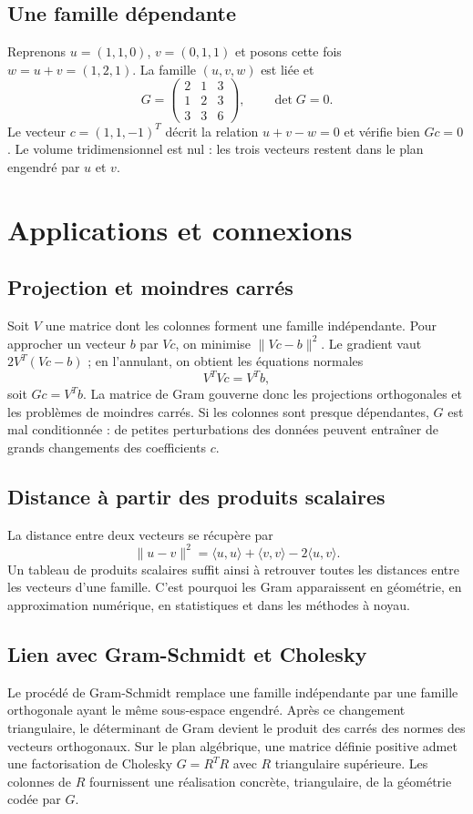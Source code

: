 \subsection{Une famille dépendante}
Reprenons $u=(1,1,0)$, $v=(0,1,1)$ et posons cette fois $w=u+v=(1,2,1)$. La famille $(u,v,w)$ est liée et
\[
 G=\begin{pmatrix}2&1&3\\1&2&3\\3&3&6\end{pmatrix},\qquad \det G=0.
\]
Le vecteur $c=(1,1,-1)^T$ décrit la relation $u+v-w=0$ et vérifie bien $Gc=0$. Le volume tridimensionnel est nul : les trois vecteurs restent dans le plan engendré par $u$ et $v$.

\section{Applications et connexions}
\subsection{Projection et moindres carrés}
Soit $V$ une matrice dont les colonnes forment une famille indépendante. Pour approcher un vecteur $b$ par $Vc$, on minimise $\|Vc-b\|^2$. Le gradient vaut $2V^T(Vc-b)$ ; en l'annulant, on obtient les équations normales
\[
 V^TVc=V^Tb,
\]
soit $Gc=V^Tb$. La matrice de Gram gouverne donc les projections orthogonales et les problèmes de moindres carrés. Si les colonnes sont presque dépendantes, $G$ est mal conditionnée : de petites perturbations des données peuvent entraîner de grands changements des coefficients $c$.

\subsection{Distance à partir des produits scalaires}
La distance entre deux vecteurs se récupère par
\[
 \|u-v\|^2=\langle u,u\rangle+\langle v,v\rangle-2\langle u,v\rangle.
\]
Un tableau de produits scalaires suffit ainsi à retrouver toutes les distances entre les vecteurs d'une famille. C'est pourquoi les Gram apparaissent en géométrie, en approximation numérique, en statistiques et dans les méthodes à noyau.

\subsection{Lien avec Gram-Schmidt et Cholesky}
Le procédé de Gram-Schmidt remplace une famille indépendante par une famille orthogonale ayant le même sous-espace engendré. Après ce changement triangulaire, le déterminant de Gram devient le produit des carrés des normes des vecteurs orthogonaux. Sur le plan algébrique, une matrice définie positive admet une factorisation de Cholesky $G=R^TR$ avec $R$ triangulaire supérieure. Les colonnes de $R$ fournissent une réalisation concrète, triangulaire, de la géométrie codée par $G$.

